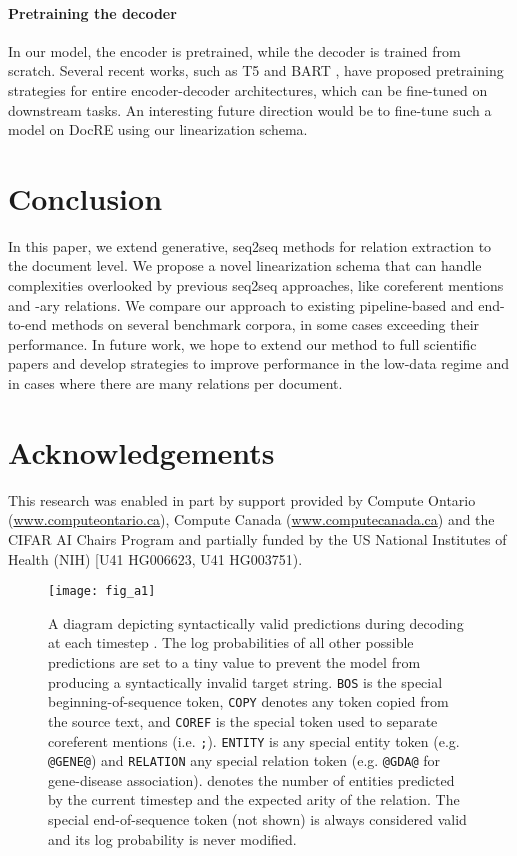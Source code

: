 \documentclass[11pt]{article}
\begin{document}
\paragraph{Pretraining the decoder}

In our model, the encoder is pretrained, while the decoder is trained from scratch. Several recent works, such as T5 \citep{raffel2020exploring} and BART \citep{lewis2019bart}, have proposed pretraining strategies for entire encoder-decoder architectures, which can be fine-tuned on downstream tasks. An interesting future direction would be to fine-tune such a model on DocRE using our linearization schema.

\section{Conclusion}

In this paper, we extend generative, seq2seq methods for relation extraction to the document level. We propose a novel linearization schema that can handle complexities overlooked by previous seq2seq approaches, like coreferent mentions and -ary relations. We compare our approach to existing pipeline-based and end-to-end methods on several benchmark corpora, in some cases exceeding their performance. In future work, we hope to extend our method to full scientific papers and develop strategies to improve performance in the low-data regime and in cases where there are many relations per document.

\section*{Acknowledgements}

This research was enabled in part by support provided by Compute Ontario (\href{https://www.computeontario.ca/}{www.computeontario.ca}), Compute Canada (\href{https://www.computecanada.ca/}{www.computecanada.ca}) and the CIFAR AI Chairs Program and partially funded by the US National Institutes of Health (NIH) [U41 HG006623, U41 HG003751).



\appendix

\begin{figure*}[t]
\centering
\texttt{[image: fig\_a1]}
\caption{A diagram depicting syntactically valid predictions during decoding at each timestep . The log probabilities of all other possible predictions are set to a tiny value to prevent the model from producing a syntactically invalid target string. \texttt{BOS} is the special beginning-of-sequence token, \texttt{COPY} denotes any token copied from the source text, and \texttt{COREF} is the special token used to separate coreferent mentions (i.e. \texttt{;}). \texttt{ENTITY} is any special entity token (e.g. \texttt{@GENE@}) and \texttt{RELATION} any special relation token (e.g. \texttt{@GDA@} for gene-disease association).  denotes the number of entities predicted by the current timestep and  the expected arity of the relation. The special end-of-sequence token (not shown) is always considered valid and its log probability is never modified.}
\label{fig:a1}
\end{figure*}
\end{document}
